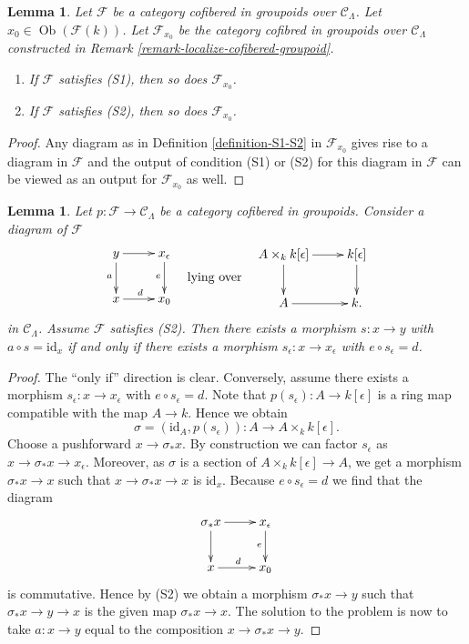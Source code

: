 \documentclass{stacks-project}
\theoremstyle{plain}
\newtheorem{lemma}[subsection]{Lemma}
\theoremstyle{definition}
\theoremstyle{remark}
\numberwithin{equation}{subsection}
\def\Ob{\mathop{\mathrm{Ob}}\nolimits}
\begin{document}
\begin{lemma}
\label{lemma-S1-S2-localize}
Let $\mathcal{F}$ be a category cofibered in groupoids over
$\mathcal{C}_\Lambda$. Let $x_0 \in \Ob(\mathcal{F}(k))$.
Let $\mathcal{F}_{x_0}$ be the category cofibred in groupoids over
$\mathcal{C}_\Lambda$ constructed in
Remark \ref{remark-localize-cofibered-groupoid}.
\begin{enumerate}
\item If $\mathcal{F}$ satisfies (S1), then so does $\mathcal{F}_{x_0}$.
\item If $\mathcal{F}$ satisfies (S2), then so does $\mathcal{F}_{x_0}$.
\end{enumerate}
\end{lemma}

\begin{proof}
Any diagram as in
Definition \ref{definition-S1-S2}
in $\mathcal{F}_{x_0}$ gives rise to a diagram in $\mathcal{F}$
and the output of condition (S1) or (S2) for this diagram in $\mathcal{F}$
can be viewed as an output for $\mathcal{F}_{x_0}$ as well.
\end{proof}

\begin{lemma}
\label{lemma-lifting-section}
Let $p: \mathcal{F} \to \mathcal{C}_\Lambda$ be a category cofibered in
groupoids. Consider a diagram of $\mathcal{F}$
$$
\vcenter{
\xymatrix{
y \ar[r] \ar[d]_a & x_\epsilon \ar[d]_e \\
x \ar[r]^d        & x_0
}
}
\quad\text{lying over}\quad
\vcenter{
\xymatrix{
A \times_k k[\epsilon] \ar[r] \ar[d] & k[\epsilon] \ar[d] \\
A \ar[r] & k.
}
}
$$
in $\mathcal{C}_\Lambda$. Assume $\mathcal{F}$ satisfies (S2).
Then there exists a morphism $s : x \to y$ with $a \circ s = \text{id}_x$
if and only if there exists a morphism $s_\epsilon : x \to x_\epsilon$
with $e \circ s_\epsilon = d$.
\end{lemma}

\begin{proof}
The ``only if'' direction is clear.  Conversely, assume there exists a
morphism $s_\epsilon : x \to x_\epsilon$ with $e \circ s_\epsilon = d$.
Note that $p(s_\epsilon) : A \to k[\epsilon]$ is a ring map compatible
with the map $A \to k$. Hence we obtain
$$
\sigma = (\text{id}_A, p(s_\epsilon)) : A \to A \times_k k[\epsilon].
$$
Choose a pushforward $x \to \sigma_*x$. By construction we can factor
$s_\epsilon$ as $x \to \sigma_*x \to x_\epsilon$. Moreover, as $\sigma$
is a section of $A \times_k k[\epsilon] \to A$, we get a morphism
$\sigma_*x \to x$ such that $x \to \sigma_*x \to x$ is $\text{id}_x$.
Because $e \circ s_\epsilon = d$ we find that the diagram
$$
\xymatrix{
\sigma_*x \ar[r] \ar[d] & x_\epsilon \ar[d]_e \\
x \ar[r]^d        & x_0
}
$$
is commutative. Hence by (S2) we obtain a morphism $\sigma_*x \to y$
such that $\sigma_*x \to y \to x$ is the given map $\sigma_*x \to x$.
The solution to the problem is now to take $a : x \to y$ equal to
the composition $x \to \sigma_*x \to y$.
\end{proof}
\end{document}
